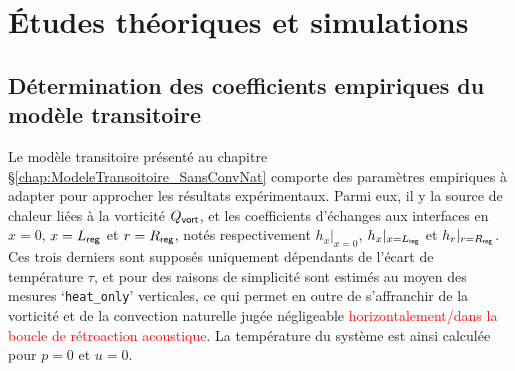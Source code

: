 \chapter{\'Etudes théoriques et simulations}
\mylocaltoc

\section{Détermination des coefficients empiriques du modèle transitoire}

Le modèle transitoire présenté au chapitre §\ref{chap:ModeleTransoitoire_SansConvNat} comporte des paramètres empiriques à adapter pour approcher les résultats expérimentaux. Parmi eux, il y la source de chaleur liées à la vorticité $Q_{\sf vort}$, et les coefficients d'échanges aux interfaces en $x=0$, $x=L_{\sf reg}$ et $r=R_{\sf reg}$, notés respectivement $h_{x}|_{x=0}$, $h_{x}|_{x=L_{\sf reg}}$ et $h_{r}|_{r=R_{\sf reg}}$. Ces trois derniers sont supposés uniquement dépendants de l'écart de température $\tau$, et pour des raisons de simplicité sont estimés au moyen des mesures `\texttt{heat\_only}' verticales, ce qui permet en outre de s'affranchir de la vorticité et de la convection naturelle jugée négligeable \textcolor{red}{horizontalement/dans la boucle de rétroaction acoustique}. La température du système est ainsi calculée pour $p=0$ et $u=0$.